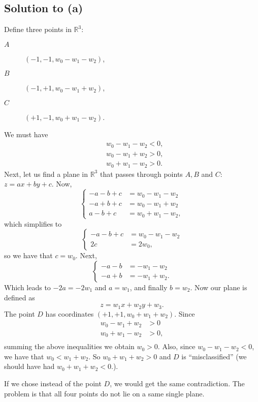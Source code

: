\documentclass[10pt]{article}
\begin{document}
\subsection*{Solution to (a)}
Define three points in $\mathbb{R}^3$:
\begin{description}
\item[$A$] $(-1, -1, w_0 - w_1 - w_2)$,
\item[$B$] $(-1, +1, w_0 - w_1 + w_2)$,
\item[$C$] $(+1, -1, w_0 + w_1 - w_2)$.
\end{description}
We must have
\begin{align*}
& w_0 - w_1 - w_2 < 0, \\
& w_0 - w_1 + w_2 > 0, \\
& w_0 + w_1 - w_2 > 0.
\end{align*}
Next, let us find a plane in $\mathbb{R}^3$ that passes through points $A, B$ and $C$: $z = ax + by + c$. Now,
\[
\begin{cases}
-a - b + c &= w_0 - w_1 - w_2 \\
-a + b + c &= w_0 - w_1 + w_2 \\
a - b + c  &= w_0 + w_1 - w_2,
\end{cases}
\]
which simplifies to
\[
\begin{cases}
-a - b + c &= w_0 - w_1 - w_2 \\
2c &= 2w_0,
\end{cases}
\]
so we have that $c = w_0$. Next,
\[
\begin{cases}
-a - b &= -w_1 - w_2 \\
-a + b & = -w_1 + w_2.
\end{cases}
\]
Which leads to $-2a = -2w_1$ and $a = w_1$, and finally $b = w_2$. Now our plane is defined as
\[
z = w_1x + w_2y + w_3.
\]
The point $D$ has coordinates $(+1, +1, w_0 + w_1 + w_2)$. Since
\begin{align*}
w_0 - w_1 + w_2 &> 0 \\
w_0 + w_1 - w_2 &> 0, \\
\end{align*}
summing the above inequalities we obtain $w_0 > 0$. Also, since $w_0 - w_1 - w_2 < 0$, we have that $w_0 < w_1 + w_2$. So $w_0 + w_1 + w_2 > 0$ and $D$ is ``misclassified'' (we should have had $w_0 + w_1 + w_2 < 0$.). 

If we chose instead of the point $D$, we would get the same contradiction. The problem is that all four points do not lie on a same single plane.
\end{document}
